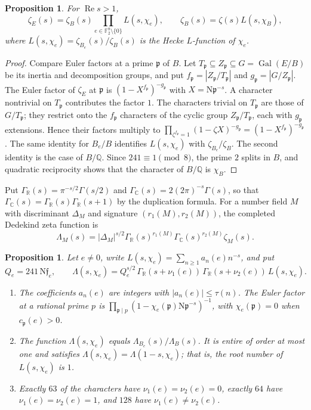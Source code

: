 \documentclass[11pt]{amsart}
\numberwithin{equation}{section}
\newtheorem{proposition}[equation]{Proposition}
\theoremstyle{definition}
\theoremstyle{remark}
\DeclareMathOperator{\Gal}{Gal}
\newcommand{\Ftwo}{\mathbb F_2}
\newcommand{\Q}{\mathbb Q}
\newcommand{\R}{\mathbb R}
\newcommand{\C}{\mathbb C}
\begin{document}
\begin{proposition}\label{gf:factorization}
For $\operatorname{Re}s>1$,
\[
 \zeta_E(s)=\zeta_B(s)\prod_{e\in\Ftwo^8\setminus\{0\}}L(s,\chi_e),
 \qquad \zeta_B(s)=\zeta(s)L(s,\chi_B),
\]
where $L(s,\chi_e)=\zeta_{B_e}(s)/\zeta_B(s)$ is the Hecke $L$-function of
$\chi_e$.
\end{proposition}

\begin{proof}
Compare Euler factors at a prime $\mathfrak p$ of $B$. Let $T_{\mathfrak
p}\subseteq Z_{\mathfrak p}\subseteq G=\Gal(E/B)$ be its inertia and
decomposition groups, and put $f_{\mathfrak p}=|Z_{\mathfrak p}/T_{\mathfrak
p}|$ and $g_{\mathfrak p}=|G/Z_{\mathfrak p}|$. The Euler factor of $\zeta_E$
at $\mathfrak p$ is $(1-X^{f_{\mathfrak p}})^{-g_{\mathfrak p}}$ with
$X=\mathrm N\mathfrak p^{-s}$. A character nontrivial on $T_{\mathfrak p}$
contributes the factor $1$. The characters trivial on $T_{\mathfrak p}$ are
those of $G/T_{\mathfrak p}$; they restrict onto the $f_{\mathfrak p}$
characters of the cyclic group $Z_{\mathfrak p}/T_{\mathfrak p}$, each with
$g_{\mathfrak p}$ extensions. Hence their factors multiply to
$\prod_{\zeta^{f_{\mathfrak p}}=1}(1-\zeta X)^{-g_{\mathfrak p}}
=(1-X^{f_{\mathfrak p}})^{-g_{\mathfrak p}}$. The same identity for $B_e/B$
identifies $L(s,\chi_e)$ with $\zeta_{B_e}/\zeta_B$. The second identity is
the case of $B/\Q$. Since $241\equiv1\pmod8$, the prime $2$ splits in $B$,
and quadratic reciprocity shows that the character of $B/\Q$ is
$\chi_B$.
\end{proof}

Put $\Gamma_\R(s)=\pi^{-s/2}\Gamma(s/2)$ and
$\Gamma_\C(s)=2(2\pi)^{-s}\Gamma(s)$, so that
$\Gamma_\C(s)=\Gamma_\R(s)\Gamma_\R(s+1)$ by the duplication formula. For a
number field $M$ with discriminant $\Delta_M$ and signature
$(r_1(M),r_2(M))$, the completed Dedekind zeta function is
\[
 \Lambda_M(s)=|\Delta_M|^{s/2}\Gamma_\R(s)^{r_1(M)}\Gamma_\C(s)^{r_2(M)}
 \zeta_M(s).
\]

\begin{proposition}\label{gf:degree-two}
Let $e\ne0$, write $L(s,\chi_e)=\sum_{n\ge1}a_n(e)n^{-s}$, and put
\[
 Q_e=241\,\mathrm N\mathfrak f_e,\qquad
 \Lambda(s,\chi_e)=Q_e^{s/2}\,\Gamma_\R(s+\nu_1(e))\,\Gamma_\R(s+\nu_2(e))\,
 L(s,\chi_e).
\]
\begin{enumerate}
\item The coefficients $a_n(e)$ are integers with $|a_n(e)|\le\tau(n)$. The
 Euler factor at a rational prime $p$ is
 $\prod_{\mathfrak p\mid p}(1-\chi_e(\mathfrak p)\mathrm N\mathfrak p^{-s})^{-1}$,
 with $\chi_e(\mathfrak p)=0$ when $c_{\mathfrak p}(e)>0$.
\item The function $\Lambda(s,\chi_e)$ equals $\Lambda_{B_e}(s)/\Lambda_B(s)$.
 It is entire of order at most one and satisfies
 $\Lambda(s,\chi_e)=\Lambda(1-s,\chi_e)$; that is, the root number of
 $L(s,\chi_e)$ is $1$.
\item Exactly $63$ of the characters have $\nu_1(e)=\nu_2(e)=0$, exactly
 $64$ have $\nu_1(e)=\nu_2(e)=1$, and $128$ have $\nu_1(e)\ne\nu_2(e)$.
\end{enumerate}
\end{proposition}
\end{document}
